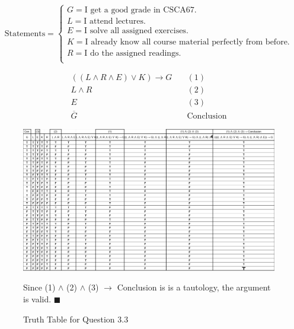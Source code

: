 \documentclass[]{article}
\begin{document}
\[
    \text{Statements} = \begin{cases}
        G = \text{I get a good grade in CSCA67.} \\         
        L = \text{I attend lectures.} \\
        E = \text{I solve all assigned exercises.} \\
        K = \text{I already know all course material perfectly from before.} \\
        R = \text{I do the assigned readings.} \\
    \end{cases}
\]
\begin{center}
\end{center}
\begin{align*}
    ((L \land R \land E) \lor K) \rightarrow G & \quad (1) \\
    L \land R & \quad (2) \\
    E & \quad (3) \\
    \overline{G} &  \quad \text{Conclusion}
\end{align*}
\begin{figure}[h!]
    \begin{center}
        \includegraphics[totalheight=8cm]{images/Q3P3.jpg}
        
    \end{center}
    \caption{Since (1) $\land$ (2) $\land$ (3) $\to$ Conclusion is is a tautology, the argument is valid. $\blacksquare$}
    \caption{Truth Table for Question 3.3}
\end{figure}
\begin{center}
     \\
    \\
\end{center}
\end{document}
